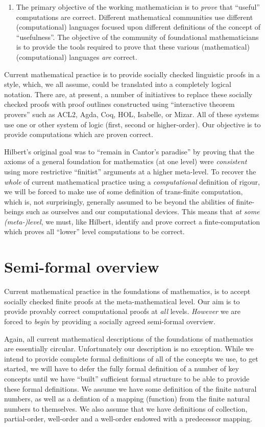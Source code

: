 \begin{enumerate}
\item	The primary objective of the working mathematician is to \emph{prove} that
``useful'' computations are correct. Different mathematical communities use
different (computational) languages focused upon different definitions of the
concept of ``usefulness''. The objective of the community of foundational
mathematicians is to provide the tools required to prove that these various
(mathematical) (computational) languages \emph{are} correct.

\end{enumerate}

Current mathematical practice is to provide socially checked linguistic proofs
in a style, which, we all assume, could be translated into a completely logical
notation. There are, at present, a number of initiatives to replace these
socially checked proofs with proof outlines constructed using ``interactive
theorem provers'' such as ACL2, Agda, Coq, HOL, Isabelle, or Mizar. All of these
systems use one or other system of logic (first, second or higher-order). 
Our objective is to provide computations which are proven correct. 

Hilbert's original goal was to ``remain in Cantor's paradise'' by proving that
the axioms of a general foundation for mathematics (at one level) were
\emph{consistent} using more restrictive ``finitist'' arguments at a higher
meta-level. To recover the \emph{whole} of current mathematical practice using a
\emph{computational} definition of rigour, we will be forced to make use of some
definition of trans-finite computation, which is, not surprisingly, generally
assumed to be beyond the abilities of finite-beings such as ourselves and our
computational devices. This means that \emph{at some (meta-)level}, we must,
like Hilbert, identify and prove correct a finte-computation which proves all
``lower'' level computations to be correct.

\section{Semi-formal overview}

Current mathematical practice in the foundations of mathematics, is to accept
socially checked finite proofs at the meta-mathematical level. Our aim is to
provide provably correct computational proofs at \emph{all} levels.
\emph{However} we are forced to \emph{begin} by providing a socially agreed
semi-formal overview.

Again, all current mathematical descriptions of the foundations of mathematics
are essentially circular. Unfortunately our description is no exception. While
we intend to provide complete formal definitions of all of the concepts we use,
to get started, we will have to defer the fully formal definition of a number of
key concepts until we have ``built'' sufficient formal structure to be able to
provide these formal definitions. We assume we have some definition of the
finite natural numbers, as well as a defintion of a mapping (function) from the
finite natural numbers to themselves. We also assume that we have definitions of
collection, partial-order, well-order and a well-order endowed with a
predecessor mapping.

